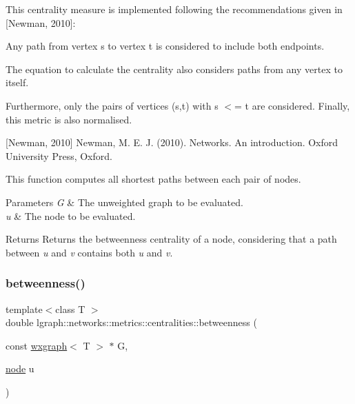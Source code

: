 This centrality measure is implemented following the recommendations given in \mbox{[}Newman, 2010\mbox{]}\+:
\begin{DoxyItemize}
\item Any path from vertex \textquotesingle{}s\textquotesingle{} to vertex \textquotesingle{}t\textquotesingle{} is considered to include both endpoints.
\item The equation to calculate the centrality also considers paths from any vertex to itself.
\end{DoxyItemize}

Furthermore, only the pairs of vertices (s,t) with s $<$= t are considered. Finally, this metric is also normalised.

\mbox{[}Newman, 2010\mbox{]} Newman, M. E. J. (2010). Networks. An introduction. Oxford University Press, Oxford.

This function computes all shortest paths between each pair of nodes.


\begin{DoxyParams}{Parameters}
{\em G} & The unweighted graph to be evaluated. \\
\hline
{\em u} & The node to be evaluated. \\
\hline
\end{DoxyParams}
\begin{DoxyReturn}{Returns}
Returns the betweenness centrality of a node, considering that a path between {\itshape u} and {\itshape v} contains both {\itshape u} and {\itshape v}. 
\end{DoxyReturn}
\mbox{\label{namespacelgraph_1_1networks_1_1metrics_1_1centralities_a5a8a94d9361a49ffa657d8d6541be4be}} 
\subsubsection{\texorpdfstring{betweenness()}{betweenness()}\hspace{0.1cm}{\footnotesize\ttfamily [2/8]}}
{\footnotesize\ttfamily template$<$class T $>$ \\
double lgraph\+::networks\+::metrics\+::centralities\+::betweenness (\begin{DoxyParamCaption}\item[{const \hyperlink{classlgraph_1_1wxgraph}{wxgraph}$<$ T $>$ $\ast$}]{G,  }\item[{\hyperlink{namespacelgraph_a397169dd66adf725210a30fb7251773e}{node}}]{u }\end{DoxyParamCaption})}



